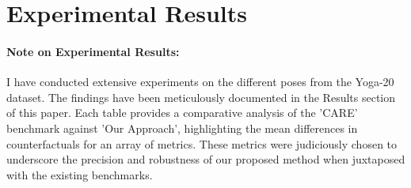 \section*{Experimental Results}


\paragraph{Note on Experimental Results:}
I have conducted extensive experiments on the different poses from the Yoga-20 dataset. The findings have been meticulously documented in the Results section of this paper. Each table provides a comparative analysis of the 'CARE' benchmark against 'Our Approach', highlighting the mean differences in counterfactuals for an array of metrics. These metrics were judiciously chosen to underscore the precision and robustness of our proposed method when juxtaposed with the existing benchmarks.

